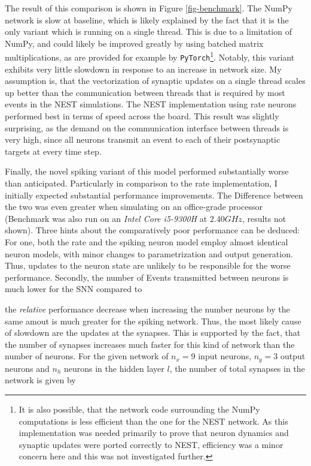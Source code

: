 The result of this comparison is shown in Figure \ref{fig-benchmark}. The NumPy network is slow at baseline, which is
likely explained by the fact that it is the only variant which is running on a single thread. This is due to a
limitation of NumPy, and could likely be improved greatly by using batched matrix multiplications, as are provided for
example by \texttt{PyTorch}\footnote{It is also possible, that the network code surrounding the NumPy computations is
less efficient than the one for the NEST network. As this implementation was needed primarily to prove that neuron
dynamics and synaptic updates were ported correctly to NEST, efficiency was a minor concern here and this was not
investigated further.}.  Notably, this variant exhibits very little slowdown in response to an increase in network size.
My assumption is, that the vectorization of synaptic updates on a single thread scales up better than the communication
between threads that is required by most events in the NEST simulations. The NEST implementation using rate neurons
performed best in terms of speed across the board. This result was slightly surprising, as the demand on the
communication interface between threads is very high, since all neurons transmit an event to each of their postsynaptic
targets at every time step.

Finally, the novel spiking variant of this model performed substantially worse than anticipated. Particularly in
comparison to the rate implementation, I initially expected substantial performance improvements. The Difference between
the two was even greater when simulating on an office-grade processor (Benchmark was also run on an \textit{Intel Core
i5-9300H} at $2.40GHz$, results not shown). Three hints about the comparatively poor performance can be deduced: For
one, both the rate and the spiking neuron model employ almost identical neuron models, with minor changes to
parametrization and output generation. Thus, updates to the neuron state are unlikely to be responsible for the worse
performance. Secondly, the number of Events transmitted between neurons is much lower for the SNN compared to

the \textit{relative} performance decrease when increasing the number neurons by the same amout is much greater for the
spiking network. Thus, the most likely cause of slowdown are the updates at the synapses. This is supported by the fact,
that the number of synapses increases much faster for this kind of network than the number of neurons. For the given
network of $n_{x} = 9$ input neurons, $n_y = 3$ output neurons and $n_{h}$ neurons in the hidden layer $l$, the number
of total synapses in the network is given by

